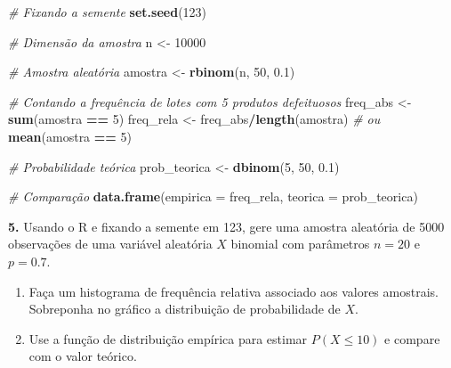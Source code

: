 \documentclass[
]{book}
\newenvironment{Shaded}{\begin{snugshade}}{\end{snugshade}}
\newcommand{\AttributeTok}[1]{\textcolor[rgb]{0.13,0.29,0.53}{#1}}
\newcommand{\CommentTok}[1]{\textcolor[rgb]{0.56,0.35,0.01}{\textit{#1}}}
\newcommand{\DecValTok}[1]{\textcolor[rgb]{0.00,0.00,0.81}{#1}}
\newcommand{\FloatTok}[1]{\textcolor[rgb]{0.00,0.00,0.81}{#1}}
\newcommand{\FunctionTok}[1]{\textcolor[rgb]{0.13,0.29,0.53}{\textbf{#1}}}
\newcommand{\NormalTok}[1]{#1}
\newcommand{\OtherTok}[1]{\textcolor[rgb]{0.56,0.35,0.01}{#1}}
\newcommand{\SpecialCharTok}[1]{\textcolor[rgb]{0.81,0.36,0.00}{\textbf{#1}}}
\begin{document}
\begin{Shaded}
\begin{Highlighting}[]
\CommentTok{\# Fixando a semente}
\FunctionTok{set.seed}\NormalTok{(}\DecValTok{123}\NormalTok{)}

\CommentTok{\# Dimensão da amostra}
\NormalTok{n }\OtherTok{\textless{}{-}} \DecValTok{10000}

\CommentTok{\# Amostra aleatória}
\NormalTok{amostra }\OtherTok{\textless{}{-}} \FunctionTok{rbinom}\NormalTok{(n, }\DecValTok{50}\NormalTok{, }\FloatTok{0.1}\NormalTok{)}

\CommentTok{\# Contando a frequência de lotes com 5 produtos defeituosos}
\NormalTok{freq\_abs }\OtherTok{\textless{}{-}} \FunctionTok{sum}\NormalTok{(amostra }\SpecialCharTok{==} \DecValTok{5}\NormalTok{)}
\NormalTok{freq\_rela }\OtherTok{\textless{}{-}}\NormalTok{ freq\_abs}\SpecialCharTok{/}\FunctionTok{length}\NormalTok{(amostra)}
\CommentTok{\# ou}
\FunctionTok{mean}\NormalTok{(amostra }\SpecialCharTok{==} \DecValTok{5}\NormalTok{)}

\CommentTok{\# Probabilidade teórica}
\NormalTok{prob\_teorica }\OtherTok{\textless{}{-}} \FunctionTok{dbinom}\NormalTok{(}\DecValTok{5}\NormalTok{, }\DecValTok{50}\NormalTok{, }\FloatTok{0.1}\NormalTok{)}

\CommentTok{\# Comparação}
\FunctionTok{data.frame}\NormalTok{(}\AttributeTok{empirica =}\NormalTok{ freq\_rela, }\AttributeTok{teorica =}\NormalTok{ prob\_teorica)}
\end{Highlighting}
\end{Shaded}

\textbf{5.} Usando o R e fixando a semente em 123, gere uma amostra aleatória
de 5000 observações de uma variável aleatória \(X\) binomial com
parâmetros \(n = 20\) e \(p = 0.7\).

\begin{enumerate}
\def\labelenumi{(\alph{enumi})}
\item
  Faça um histograma de frequência relativa associado aos valores
  amostrais. Sobreponha no gráfico a distribuição de probabilidade de \(X\).
\item
  Use a função de distribuição empírica para estimar \(P(X\leq 10)\)
  e compare com o valor teórico.
\end{enumerate}
\end{document}
